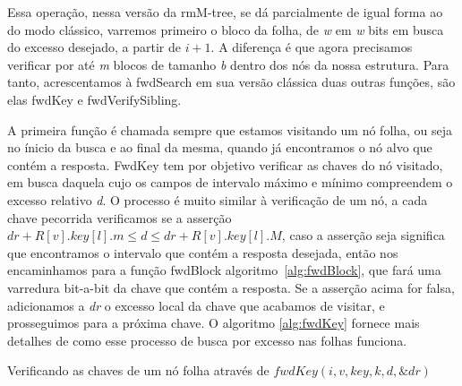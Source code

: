 Essa operação, nessa versão da rmM-tree, se dá parcialmente de igual forma ao do modo clássico, varremos primeiro o bloco da folha,
de \textit{w} em \textit{w} bits em busca do excesso desejado, a partir de $i+1$. 
A diferença é que agora precisamos verificar por até \textit{m} blocos de tamanho \textit{b} dentro dos nós da nossa estrutura.
Para tanto, acrescentamos à fwdSearch em sua versão clássica duas outras funções, são elas fwdKey e fwdVerifySibling.

A primeira função é chamada sempre que estamos visitando um nó folha, ou seja no ínicio da busca e ao final da mesma, quando já encontramos o nó alvo que contém a resposta. 
FwdKey tem por objetivo verificar as chaves do nó visitado, em busca daquela cujo os campos de intervalo máximo e mínimo compreendem o excesso relativo \textit{d}.
O processo é muito similar à verificação de um nó, a cada chave pecorrida verificamos se a asserção $dr + R[v].key[l].m \leq d \leq dr + R[v].key[l].M$, caso a asserção seja 
significa que encontramos o intervalo que contém a resposta desejada, então nos encaminhamos para a função fwdBlock algoritmo~\ref{alg:fwdBlock}, que fará uma varredura bit-a-bit da chave que contém a resposta.
Se a asserção acima for falsa, adicionamos a \textit{dr} o excesso local da chave que acabamos de visitar, e prosseguimos para a próxima chave. 
O algoritmo \ref{alg:fwdKey} fornece mais detalhes de como esse processo de busca por excesso nas folhas funciona.

\begin{algorithm}[h!]
    \vspace{.3cm}
    \caption{Verificando as chaves de um nó folha através de $fwdKey(i,v,key,k,d,\&dr)$}
    \label{alg:fwdKey}
    \end{algorithm}
    

